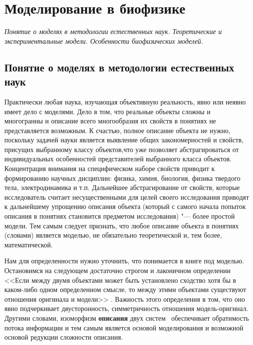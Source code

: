 \documentclass[12pt,a4paper,oneside]{book}
\begin{document}
\newpage
\section{Моделирование в биофизике}
{\it Понятие о моделях в методологии естественных наук. Теоретические и экспериментальные модели. Особенности биофизических моделей.}

\subsection{Понятие о моделях в методологии естественных наук}

Практически любая наука, изучающая объективную реальность, явно или неявно имеет дело с моделями. Дело в том, что реальные объекты сложны и многогранны и описание всего многообразия их свойств в понятиях не представляется возможным. К счастью, полное описание объекта не нужно, поскольку задачей науки является выявление общих закономерностей и свойств, присущих выбранному классу объектов,что уже позволяет абстрагироваться от индивидуальных особенностей представителей выбранного класса объектов. Концентрация внимания на специфическом наборе свойств приводит к формированию научных дисциплин: физика, химия, биология, физика твердого тела, электродинамика и т.п. Дальнейшее абстрагирование от свойств, которые исследователь считает несущественными для целей своего исследования приводят к дальнейшему упрощению описания объекта (который с самого начала попыток описания в понятиях становится предметом исследования) "--- более простой модели. Тем самым следует признать, что любое описание объекта в понятиях (словами) является моделью, не обязательно теоретической и, тем более, математической. 

Нам для определенности нужно уточнить, что понимается в книге под моделью. Остановимся на следующем достаточно строгом и лаконичном определении <<Если между двумя объектами может быть установлено сходство хотя бы в каком-либо одном определенном смысле, то между этими объектами существуют отношения оригинала и модели>> 
\cite[стр. 40]{Lerner1976}. Важность этого определения в том, что оно явно подчеркивает двусторонность, симметричность отношения модель-оригинал. Другими словами, изоморфизм {\bf описания} двух систем~\cite{Kimura1985} обеспечивает обратимость потока информации и тем самым является основой моделирования и возможной основой редукции сложности описания.
\end{document}
